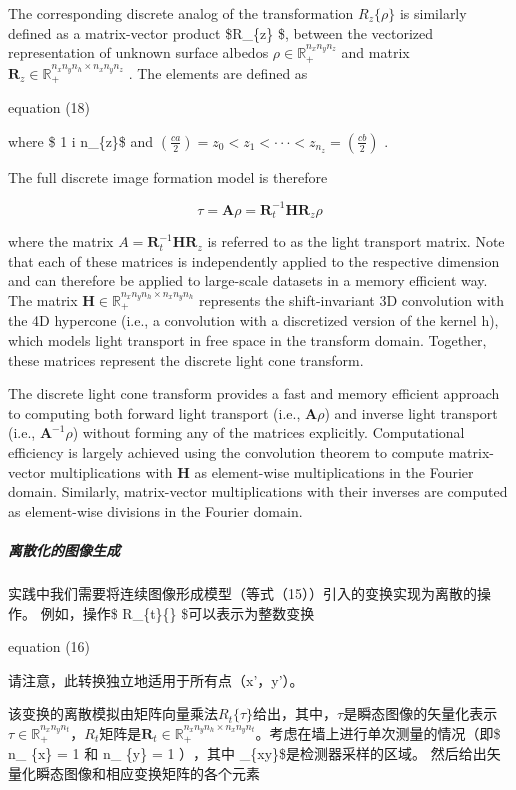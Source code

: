 \documentclass[11pt]{article}
\begin{document}
The corresponding discrete analog of the transformation
\(R_{z}\{\rho\}\) is similarly defined as a matrix-vector product
\$R\_\{z\} \rho \$, between the vectorized representation of unknown
surface albedos \(\rho \in \mathbb{R}_{+}^{n_{x}n_{y}n_{z}}\) and matrix
\(\textbf{R}_{z}\in \mathbb{R}_{+}^{n_{x}n_{y}n_{h}\times n_{x}n_{y}n_{z}}\)
. The elements are defined as

 equation (18)

where \$ 1 \leqslant i \leqslant n\_\{z\}\$ and
\((\frac{ca}{2})=z_{0}< z_{1} < ··· < z_{n_{z}} = (\frac{cb}{2})\) .

The full discrete image formation model is therefore

\[\tau = \textbf{A} \rho = \textbf{R}_t^{-1}\textbf{H}\textbf{R}_{z}\rho\]

where the matrix \(A=\textbf{R}_t^{-1}\textbf{H}\textbf{R}_{z}\) is
referred to as the light transport matrix. Note that each of these
matrices is independently applied to the respective dimension and can
therefore be applied to large-scale datasets in a memory efficient way.
The matrix
\(\textbf{H} \in \mathbb{R}_{+}^{n_{x}n_{y}n_{h}\times n_{x}n_{y}n_{h}}\)
represents the shift-invariant 3D convolution with the 4D hypercone
(i.e., a convolution with a discretized version of the kernel h), which
models light transport in free space in the transform domain. Together,
these matrices represent the discrete light cone transform.

The discrete light cone transform provides a fast and memory efficient
approach to computing both forward light transport (i.e.,
\(\textbf{A}\rho\)) and inverse light transport (i.e.,
\(\textbf{A}^{-1}\rho\)) without forming any of the matrices explicitly.
Computational efficiency is largely achieved using the convolution
theorem to compute matrix-vector multiplications with \textbf{H} as
element-wise multiplications in the Fourier domain. Similarly,
matrix-vector multiplications with their inverses are computed as
element-wise divisions in the Fourier domain.

    \subparagraph{离散化的图像生成}\label{ux79bbux6563ux5316ux7684ux56feux50cfux751fux6210}

实践中我们需要将连续图像形成模型（等式（15））引入的变换实现为离散的操作。
例如，操作\$ R\_\{t\}\{\tau \} \$可以表示为整数变换

 equation (16)

请注意，此转换独立地适用于所有点（x'，y'）。

该变换的离散模拟由矩阵向量乘法\(R_{t}\{\tau\}\)给出，其中，\(\tau\)是瞬态图像的矢量化表示\(\tau\in \mathbb{R}_{+}^{n_{x}n_{y}n_{t}}\)，\(R_{t}\)矩阵是\(\textbf{R}_{t}\in \mathbb{R}_{+}^{n_{x}n_{y}n_{h}\times n_{x}n_{y}n_{t}}\)。考虑在墙上进行单次测量的情况（即\$
n\_ \{x\} = 1 \(和\) n\_ \{y\} = 1 \(），其中\)
\Omega\_\{xy\}\$是检测器采样的区域。
然后给出矢量化瞬态图像和相应变换矩阵的各个元素
\end{document}

